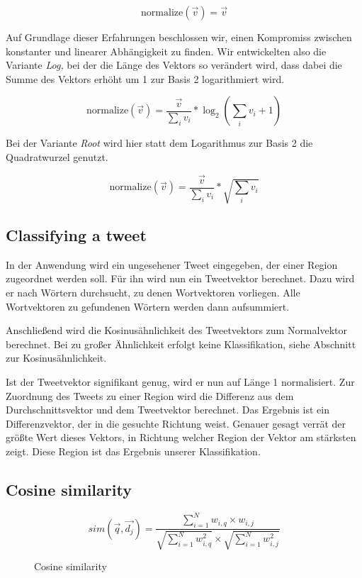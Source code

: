 \documentclass[../Main.tex]{subfiles}
\begin{document}
$$\text{normalize}(\vec v) = \vec v$$

Auf Grundlage dieser Erfahrungen beschlossen wir, einen Kompromiss zwischen konstanter und linearer Abhängigkeit zu finden. Wir entwickelten also die Variante \textit{Log,} bei der die Länge des Vektors so verändert wird, dass dabei die Summe des Vektors erhöht um 1 zur Basis 2 logarithmiert wird.

$$\text{normalize}(\vec v) = \frac{\vec v}{\sum_i v_i} * \log_2(\sum_i v_i+1)$$

Bei der Variante \textit{Root} wird hier statt dem Logarithmus zur Basis 2 die Quadratwurzel genutzt.

$$\text{normalize}(\vec v) = \frac{\vec v}{\sum_i v_i} * \sqrt{\sum_i v_i}$$

\subsection{Classifying a tweet}
In der Anwendung wird ein ungesehener Tweet eingegeben, der einer Region zugeordnet werden soll. Für ihn wird nun ein Tweetvektor berechnet. Dazu wird er nach Wörtern durchsucht, zu denen Wortvektoren vorliegen. Alle Wortvektoren zu gefundenen Wörtern werden dann aufsummiert.

Anschließend wird die Kosinusähnlichkeit des Tweetvektors zum Normalvektor berechnet. Bei zu großer Ähnlichkeit erfolgt keine Klassifikation, siehe Abschnitt zur Kosinusähnlichkeit.

Ist der Tweetvektor signifikant genug, wird er nun auf Länge 1 normalisiert. Zur Zuordnung des Tweets zu einer Region wird die Differenz aus dem Durchschnittsvektor und dem Tweetvektor berechnet. Das Ergebnis ist ein Differenzvektor, der in die gesuchte Richtung weist. Genauer gesagt verrät der größte Wert dieses Vektors, in Richtung welcher Region der Vektor am stärksten zeigt. Diese Region ist das Ergebnis unserer Klassifikation.

\subsection{Cosine similarity}
\begin{figure}[t]
  \[ sim(\vec{q},\vec{d_j}) = \frac{\sum^N_{i=1} w_{i,q} \times w_{i,j}}{\sqrt{\sum^N_{i=1}w^2_{i,q}} \times \sqrt{\sum^N_{i=1}w^2_{i,j}}} \]
  \caption{Cosine similarity}
  \label{cos_sim}
\end{figure}
\end{document}
